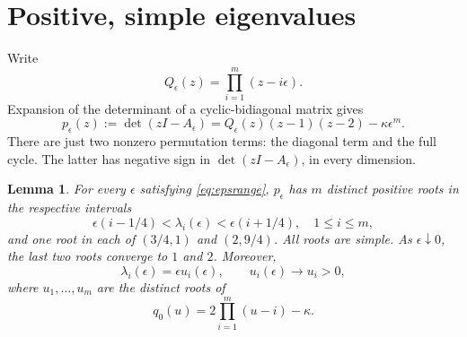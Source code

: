 \documentclass[11pt]{article}
\newtheorem{lemma}[theorem]{Lemma}
\begin{document}
\section{Positive, simple eigenvalues}
Write
\[
Q_\epsilon(z)=\prod_{i=1}^m(z-i\epsilon).
\]
Expansion of the determinant of a cyclic-bidiagonal matrix gives
\begin{equation}\label{eq:char}
p_\epsilon(z):=\det(zI-A_\epsilon)
=Q_\epsilon(z)(z-1)(z-2)-\kappa\epsilon^m.
\end{equation}
There are just two nonzero permutation terms: the diagonal term and the full cycle. The latter has negative sign in $\det(zI-A_\epsilon)$, in every dimension.

\begin{lemma}\label{lem:roots}
For every $\epsilon$ satisfying \eqref{eq:epsrange}, $p_\epsilon$ has $m$ distinct positive roots in the respective intervals
\[
\epsilon(i-1/4)<\lambda_i(\epsilon)<\epsilon(i+1/4),\quad 1\le i\le m,
\]
and one root in each of $(3/4,1)$ and $(2,9/4)$. All roots are simple. As $\epsilon\downarrow0$, the last two roots converge to $1$ and $2$. Moreover,
\[
\lambda_i(\epsilon)=\epsilon u_i(\epsilon),\qquad u_i(\epsilon)\longrightarrow u_i>0,
\]
where $u_1,\ldots,u_m$ are the distinct roots of
\begin{equation}\label{eq:lowpoly}
q_0(u)=2\prod_{i=1}^m(u-i)-\kappa.
\end{equation}
\end{lemma}
\end{document}
